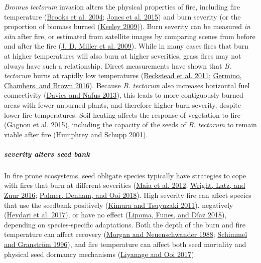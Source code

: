 \documentclass[
  12pt,
]{article}
\begin{document}
\emph{Bromus tectorum} invasion alters the physical properties of fire,
including fire temperature (\protect\hyperlink{ref-Brooks2004}{Brooks et
al. 2004}; \protect\hyperlink{ref-Jones2015}{Jones et al. 2015}) and
burn severity (or the proportion of biomass burned
(\protect\hyperlink{ref-Keeley2009}{Keeley 2009})). Burn severity can be
measured \emph{in situ} after fire, or estimated from satellite images
by comparing scenes from before and after the fire
(\protect\hyperlink{ref-Miller2009}{J. D. Miller et al. 2009}). While in
many cases fires that burn at higher temperatures will also burn at
higher severities, grass fires may not always have such a relationship.
Direct measurements have shown that \emph{B. tectorum} burns at rapidly
low temperatures (\protect\hyperlink{ref-Beckstead2011}{Beckstead et al.
2011}; \protect\hyperlink{ref-Germino2016}{Germino, Chambers, and Brown
2016}). Because \emph{B. tectorum} also increases horizontal fuel
connectivity (\protect\hyperlink{ref-Davies2013}{Davies and Nafus
2013}), this leads to more contiguously burned areas with fewer unburned
plants, and therefore higher burn severity, despite lower fire
temperatures. Soil heating affects the response of vegetation to fire
(\protect\hyperlink{ref-Gagnon2015}{Gagnon et al. 2015}), including the
capacity of the seeds of \emph{B. tectorum} to remain viable after fire
(\protect\hyperlink{ref-Humphrey2001}{Humphrey and Schupp 2001}).

\hypertarget{severity-alters-seed-bank}{%
\subparagraph{severity alters seed
bank}\label{severity-alters-seed-bank}}

In fire prone ecosystems, seed obligate species typically have
strategies to cope with fires that burn at different severities
(\protect\hyperlink{ref-Maia2012}{Maia et al. 2012};
\protect\hyperlink{ref-Wright2016}{Wright, Latz, and Zuur 2016};
\protect\hyperlink{ref-Palmer2018}{Palmer, Denham, and Ooi 2018}). High
severity fire can affect species that use the seedbank positively
(\protect\hyperlink{ref-Kimura2011}{Kimura and Tsuyuzaki 2011}),
negatively (\protect\hyperlink{ref-Heydari2017}{Heydari et al. 2017}),
or have no effect (\protect\hyperlink{ref-Lipoma2018}{Lipoma, Funes, and
Díaz 2018}), depending on species-specific adaptations. Both the depth
of the burn and fire temperature can affect recovery
(\protect\hyperlink{ref-Morgan1988}{Morgan and Neuenschwander 1988};
\protect\hyperlink{ref-Schimmel1996}{Schimmel and Granström 1996}), and
fire temperature can affect both seed mortality and physical seed
dormancy mechanisms (\protect\hyperlink{ref-Liyanage2017}{Liyanage and
Ooi 2017}).
\end{document}

